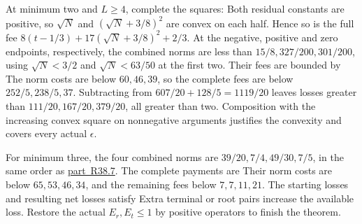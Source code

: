 At minimum two and \(L\ge4\), complete the squares:
Both residual constants are positive, so \(\sqrt N\) and \((\sqrt N+3/8)^2\) are convex on each half. Hence so is the full fee \(8(t-1/3)+17(\sqrt N+3/8)^2+2/3\). At the negative, positive and zero endpoints, respectively, the combined norms are less than \(15/8,\allowbreak 327/200,\allowbreak 301/200\), using \(\sqrt N<3/2\) and \(\sqrt N<63/50\) at the first two. Their fees are bounded by
The norm costs are below \(60,\allowbreak 46,\allowbreak 39\), so the complete fees are below \(252/5,\allowbreak 238/5,\allowbreak 37\). Subtracting from \(607/20+128/5=1119/20\) leaves losses greater than \(111/20,\allowbreak 167/20,\allowbreak 379/20\), all greater than two. Composition with the increasing convex square on nonnegative arguments justifies the convexity and covers every actual \(\epsilon\).

For minimum three, the four combined norms are \(39/20,\allowbreak 7/4,\allowbreak 49/30,\allowbreak 7/5\), in the same order as \mbox{\hyperref[part:R38.7]{part R38.7}}. The complete payments are
Their norm costs are below \(65,\allowbreak 53,\allowbreak 46,\allowbreak 34\), and the remaining fees below \(7,\allowbreak 7,\allowbreak 11,\allowbreak 21\). The starting losses and resulting net losses satisfy
Extra terminal or root pairs increase the available loss. Restore the actual \(E_r,\allowbreak E_t\le1\) by positive operators to finish the theorem.
